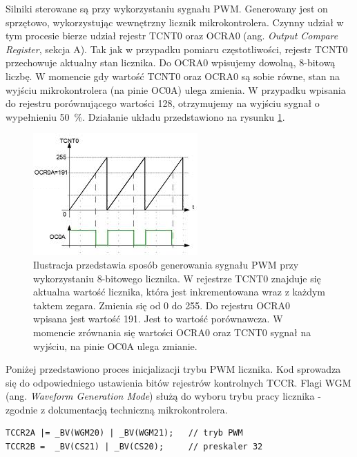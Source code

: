 Silniki sterowane są przy wykorzystaniu sygnału PWM. Generowany jest on sprzętowo, wykorzystując wewnętrzny licznik mikrokontrolera. Czynny udział w tym procesie bierze udział rejestr TCNT0 oraz OCRA0 (ang. \textit{Output Compare Register}, sekcja A). Tak jak w przypadku pomiaru częstotliwości, rejestr TCNT0 przechowuje aktualny stan licznika. Do OCRA0 wpisujemy dowolną, 8-bitową liczbę. W momencie gdy wartość TCNT0 oraz OCRA0 są sobie równe, stan na wyjściu mikrokontrolera (na pinie OC0A) ulega zmienia. W przypadku wpisania do rejestru porównującego wartości 128, otrzymujemy na wyjściu sygnał o wypełnieniu 50~\%. Działanie układu przedstawiono na rysunku \ref{gen_pwn}.
\begin{figure}[H]
    \begin{center}
      \includegraphics[scale=0.9]{imgs/pwm_gen.png}
 	\caption[Realizacja sygnału PWM.]{\small{Ilustracja przedstawia sposób generowania sygnału PWM przy wykorzystaniu 8-bitowego licznika. W rejestrze TCNT0 znajduje się aktualna wartość licznika, która jest inkrementowana wraz z każdym taktem zegara. Zmienia się od 0 do 255. Do rejestru OCRA0 wpisana jest wartość 191. Jest to wartość porównawcza. W momencie zrównania się wartości OCRA0 oraz TCNT0 sygnał na wyjściu, na pinie OC0A ulega zmianie.}\footnotemark}
	\label{gen_pwn}
    \end{center}
  \end{figure}  
\noindent
Poniżej przedstawiono proces inicjalizacji trybu PWM licznika. Kod sprowadza się do odpowiedniego ustawienia bitów rejestrów kontrolnych TCCR. Flagi WGM (ang. \textit{Waveform Generation Mode}) służą do wyboru trybu pracy licznika - zgodnie z dokumentacją techniczną mikrokontrolera\cite{nota}. 
  \begin{lstlisting}
TCCR2A |= _BV(WGM20) | _BV(WGM21);   // tryb PWM
TCCR2B =  _BV(CS21) | _BV(CS20);     // preskaler 32
\end{lstlisting}
